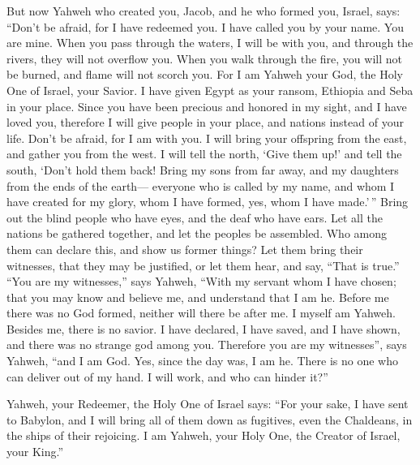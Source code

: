  But now Yahweh who created you, Jacob, and he who formed
you, Israel, says: ``Don't be afraid, for I have redeemed you. I have
called you by your name. You are mine.  When you pass
through the waters, I will be with you, and through the rivers, they
will not overflow you. When you walk through the fire, you will not be
burned, and flame will not scorch you.  For I am Yahweh your
God, the Holy One of Israel, your Savior. I have given Egypt as your
ransom, Ethiopia and Seba in your place.  Since you have
been precious and honored in my sight, and I have loved you, therefore I
will give people in your place, and nations instead of your life.
 Don't be afraid, for I am with you. I will bring your
offspring from the east, and gather you from the west.  I
will tell the north, `Give them up!' and tell the south, `Don't hold
them back! Bring my sons from far away, and my daughters from the ends
of the earth---  everyone who is called by my name, and whom
I have created for my glory, whom I have formed, yes, whom I have
made.'\,''  Bring out the blind people who have eyes, and
the deaf who have ears.  Let all the nations be gathered
together, and let the peoples be assembled. Who among them can declare
this, and show us former things? Let them bring their witnesses, that
they may be justified, or let them hear, and say, ``That is true.''
 ``You are my witnesses,'' says Yahweh, ``With my servant
whom I have chosen; that you may know and believe me, and understand
that I am he. Before me there was no God formed, neither will there be
after me.  I myself am Yahweh. Besides me, there is no
savior.  I have declared, I have saved, and I have shown,
and there was no strange god among you. Therefore you are my
witnesses'', says Yahweh, ``and I am God.  Yes, since the
day was, I am he. There is no one who can deliver out of my hand. I will
work, and who can hinder it?''

 Yahweh, your Redeemer, the Holy One of Israel says: ``For
your sake, I have sent to Babylon, and I will bring all of them down as
fugitives, even the Chaldeans, in the ships of their rejoicing.
 I am Yahweh, your Holy One, the Creator of Israel, your
King.''

